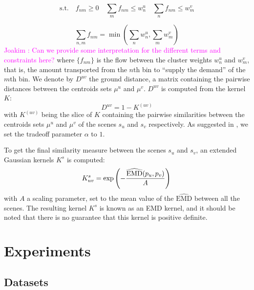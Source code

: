 \documentclass[journal]{IEEEtran}
\newcommand*{\EMD}{\mathrm{EMD}}
\newcommand{\ja}[1]{\textcolor{magenta}{Joakim : #1}}
\begin{document}
\begin{equation*}
\mathrm{s.t.} \quad f_{nm}\geq0 \quad \sum\limits_{m} f_{nm} \leq w_n^u \quad \sum\limits_{n} f_{nm} \leq w_m^v
\end{equation*}

\begin{equation*}
\sum\limits_{n,m}f_{nm} = \min\left( \sum\limits_{n} w_n^u ,\sum\limits_{m} w_m^v \right)
\end{equation*} \ja{Can we provide some interpretation for the different terms and constraints here?}
where $\lbrace f_{nm} \rbrace$ is the flow between the cluster weights $w_n^u$ and $w_m^v$, that is, the amount transported from the $n$th bin to ``supply the demand'' of the $m$th bin. We denote by $D^{uv}$ the ground distance, a matrix containing the pairwise distances between the centroids sets $\mu^u$ and $\mu^v$. $D^{uv}$ is computed from the kernel $K$:
\begin{equation*}
D^{uv}=1-K^{(uv)}
\end{equation*}
with $K^{(uv)}$ being the slice of $K$ containing the pairwise similarities between the centroids sets $\mu^u$ and $\mu^v$ of the scenes $s_u$ and $s_v$ respectively. As suggested in \cite{pele2009fast}, we set the tradeoff parameter $\alpha$ to $1$.

To get the final similarity measure between the scenes $s_u$ and $s_v$, an extended Gaussian kernels $K^s$ \cite{chapelle1999support,jing2003support} is computed:
\begin{equation}
\label{eq:ks}
K_{uv}^s = \exp\left( - \dfrac{\widehat{\EMD}(p_u,p_v)}{A} \right) \\
\end{equation}
with $A$ a scaling parameter, set to the mean value of the $\widehat{\EMD}$ between all the scenes. The resulting kernel $K^s$ is known as an EMD kernel, and it should be noted that there is no guarantee that this kernel is positive definite.

\section{Experiments}
\label{sec:experiments}

\subsection{Datasets}

\end{document}
